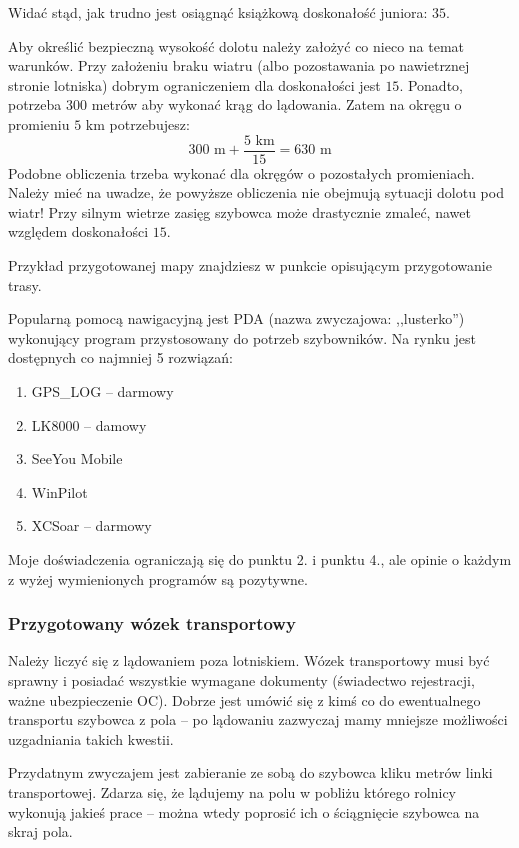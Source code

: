 \documentclass{article}
\begin{document}
\noindent
Widać stąd, jak trudno jest osiągnąć książkową doskonałość juniora: $35$.

Aby określić bezpieczną wysokość dolotu należy założyć co nieco na temat warunków.
Przy założeniu braku wiatru (albo pozostawania po nawietrznej stronie lotniska)
dobrym ograniczeniem dla doskonałości jest $15$. Ponadto, potrzeba 300 metrów
aby wykonać krąg do lądowania. Zatem na okręgu o promieniu $5 \textrm{ km}$ potrzebujesz:
\begin{equation*}
300\textrm{ m}+\frac{5\textrm{ km}}{15} = 630 \textrm{ m}
\end{equation*}
\noindent
Podobne obliczenia trzeba wykonać dla okręgów o pozostałych promieniach.
Należy mieć na uwadze, że powyższe obliczenia nie obejmują sytuacji dolotu
pod wiatr! Przy silnym wietrze zasięg szybowca może drastycznie zmaleć,
nawet względem doskonałości $15$.

Przykład przygotowanej mapy znajdziesz w punkcie opisującym przygotowanie
trasy.

Popularną pomocą nawigacyjną jest PDA (nazwa zwyczajowa: ,,lusterko'') 
wykonujący program przystosowany
do potrzeb szybowników. Na rynku jest dostępnych co najmniej 5
rozwiązań:
\begin{enumerate}
\item GPS\_LOG -- darmowy
\item LK8000 -- damowy
\item SeeYou Mobile
\item WinPilot
\item XCSoar -- darmowy
\end{enumerate}
Moje doświadczenia ograniczają się do punktu 2. i punktu 4., ale
opinie o każdym z wyżej wymienionych programów są pozytywne.

\subsubsection{Przygotowany wózek transportowy}
Należy liczyć się z lądowaniem poza lotniskiem. 
Wózek transportowy musi być sprawny i posiadać wszystkie wymagane
dokumenty (świadectwo rejestracji, ważne ubezpieczenie OC). Dobrze jest
umówić się z kimś co do ewentualnego transportu szybowca z pola -- po
lądowaniu zazwyczaj mamy mniejsze możliwości uzgadniania takich kwestii.

Przydatnym zwyczajem jest zabieranie ze sobą do szybowca kliku metrów
linki transportowej. Zdarza się, że lądujemy na polu w pobliżu którego
rolnicy wykonują jakieś prace -- można wtedy poprosić ich o ściągnięcie
szybowca na skraj pola.
\end{document}
